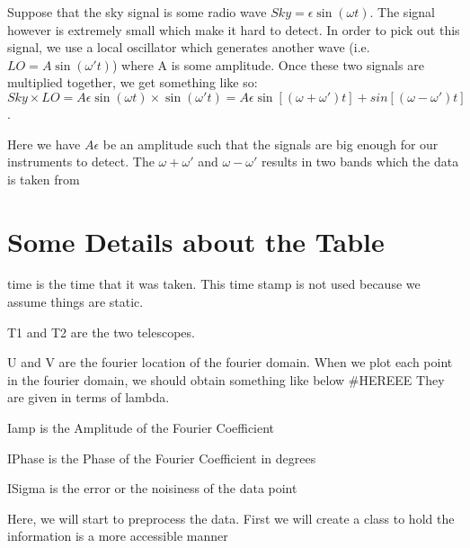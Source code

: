 \documentclass[letterpaper,10pt,english]{jupyterBook}
\begin{document}
\sphinxAtStartPar
Suppose that the sky signal is some radio wave \(Sky = \epsilon \sin(\omega t)\). The signal however is extremely small which make it hard to detect. In order to pick out this signal, we use a local oscillator which generates another wave (i.e. \(LO = A \sin(\omega't)\)) where A is some amplitude. Once these two signals are multiplied together, we get something like so: \(Sky \times LO = A \epsilon \sin(\omega t) \times \sin(\omega' t) = A \epsilon {\sin[(\omega + \omega')t] + sin [(\omega - \omega')t]}\).

\sphinxAtStartPar
Here we have \(A \epsilon\) be an amplitude such that the signals are big enough for our instruments to detect.
The \(\omega + \omega'\) and \(\omega - \omega'\) results in two bands which the data is taken from


\chapter{Some Details about the Table}
\label{\detokenize{data:some-details-about-the-table}}
\sphinxAtStartPar
time is the time that it was taken. This time stamp is not used because we assume things are static.

\sphinxAtStartPar
T1 and T2 are the two telescopes.

\sphinxAtStartPar
U and V are the fourier location of the fourier domain. When we plot each point in the fourier domain, we should obtain something like below \#HEREEE They are given in terms of lambda.

\sphinxAtStartPar
Iamp is the Amplitude of the Fourier Coefficient

\sphinxAtStartPar
IPhase is the Phase of the Fourier Coefficient in degrees

\sphinxAtStartPar
ISigma is the error or the noisiness of the data point

\sphinxAtStartPar
Here, we will start to preprocess the data. First we will create a class to hold the information is a more accessible manner
\end{document}
